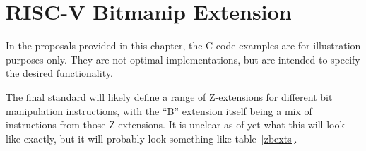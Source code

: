\chapter{RISC-V Bitmanip Extension}
\label{bext}

In the proposals provided in this chapter, the C code examples are for
illustration purposes only. They are not optimal implementations, but are
intended to specify the desired functionality.

The final standard will likely define a range of Z-extensions for different bit
manipulation instructions, with the ``B'' extension itself being a mix of
instructions from those Z-extensions. It is unclear as of yet what this will
look like exactly, but it will probably look something like table~\ref{zbexts}.

